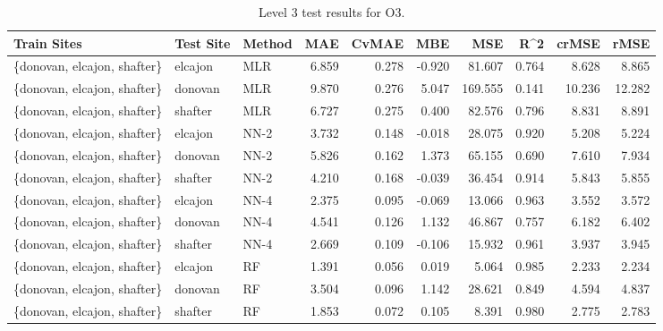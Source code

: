 \begin{table}[h]
\begin{tabular}{lllrrrrrrr}
\toprule
 Train Sites & Test Site & Method &   MAE &  CvMAE &       MBE &     MSE &   R\textasciicircum2 &  crMSE &   rMSE \\
\midrule
\{donovan, elcajon, shafter\} & elcajon & MLR & 6.859 & 0.278 & -0.920 & 81.607 & 0.764 & 8.628 & 8.865\\
\{donovan, elcajon, shafter\} & donovan & MLR & 9.870 & 0.276 & 5.047 & 169.555 & 0.141 & 10.236 & 12.282\\
\{donovan, elcajon, shafter\} & shafter & MLR & 6.727 & 0.275 & 0.400 & 82.576 & 0.796 & 8.831 & 8.891\\
\{donovan, elcajon, shafter\} & elcajon & NN-2 & 3.732 & 0.148 & -0.018 & 28.075 & 0.920 & 5.208 & 5.224\\
\{donovan, elcajon, shafter\} & donovan & NN-2 & 5.826 & 0.162 & 1.373 & 65.155 & 0.690 & 7.610 & 7.934\\
\{donovan, elcajon, shafter\} & shafter & NN-2 & 4.210 & 0.168 & -0.039 & 36.454 & 0.914 & 5.843 & 5.855\\
\{donovan, elcajon, shafter\} & elcajon & NN-4 & 2.375 & 0.095 & -0.069 & 13.066 & 0.963 & 3.552 & 3.572\\
\{donovan, elcajon, shafter\} & donovan & NN-4 & 4.541 & 0.126 & 1.132 & 46.867 & 0.757 & 6.182 & 6.402\\
\{donovan, elcajon, shafter\} & shafter & NN-4 & 2.669 & 0.109 & -0.106 & 15.932 & 0.961 & 3.937 & 3.945\\
\{donovan, elcajon, shafter\} & elcajon & RF & 1.391 & 0.056 & 0.019 & 5.064 & 0.985 & 2.233 & 2.234\\
\{donovan, elcajon, shafter\} & donovan & RF & 3.504 & 0.096 & 1.142 & 28.621 & 0.849 & 4.594 & 4.837\\
\{donovan, elcajon, shafter\} & shafter & RF & 1.853 & 0.072 & 0.105 & 8.391 & 0.980 & 2.775 & 2.783\\
\bottomrule
\end{tabular}
\caption{Level 3 test results for O3.}
\end{table}
